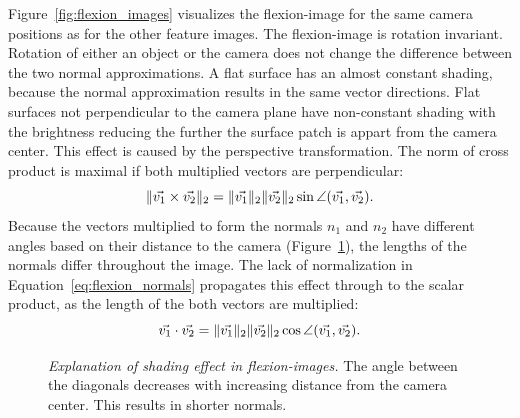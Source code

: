 Figure~\ref{fig:flexion_images} visualizes the \Gls{flexion-image} for the same camera positions as for the other feature images.
The \gls{flexion-image} is rotation invariant.
Rotation of either an object or the camera does not change the difference between the two normal approximations.
A flat surface has an almost constant shading, because the normal approximation results in the same vector directions.
Flat surfaces not perpendicular to the camera plane have non-constant shading with the brightness reducing the further the surface patch is appart from the camera center.
This effect is caused by the perspective transformation.
The norm of cross product is maximal if both multiplied vectors are perpendicular:
\begin{equation}
    \lVert\vec{v_1} \times \vec{v_2}\rVert_{2} = \lVert\vec{v_1}\rVert_{2} \lVert\vec{v_2}\rVert_{2} \sin \angle(\vec{v_1}, \vec{v_2})\text{.}
\end{equation}
Because the vectors multiplied to form the normals $n_1$ and $n_2$ have different angles based on their distance to the camera (Figure~\ref{fig:flexion_angle_decrease}), the lengths of the normals differ throughout the image.
The lack of normalization in Equation~\ref{eq:flexion_normals} propagates this effect through to the scalar product, as the length of the both vectors are multiplied:
\begin{equation}
    \vec{v_1} \cdot \vec{v_2} = \lVert\vec{v_1}\rVert_{2} \lVert\vec{v_2}\rVert_{2} \cos \angle(\vec{v_1}, \vec{v_2})\text{.}
\end{equation}
\begin{figure}[b!]
    
    \caption[Explanation of shading effect in \glspl{flexion-image}]{\emph{Explanation of shading effect in \glspl{flexion-image}.} The angle between the diagonals decreases with increasing distance from the camera center. This results in shorter normals.}\label{fig:flexion_angle_decrease}
\end{figure}
